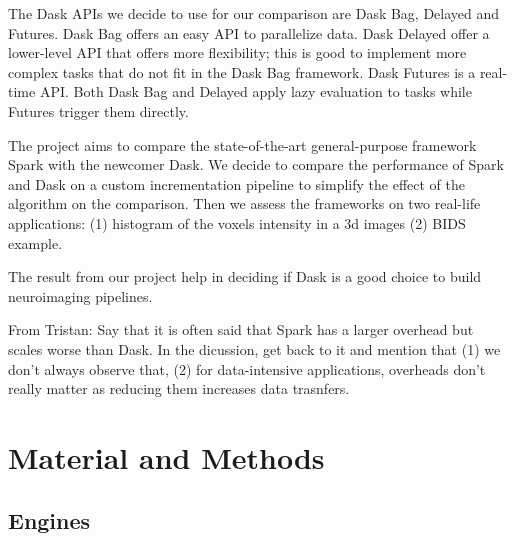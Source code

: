 \documentclass[conference]{IEEEtran}
\newcommand{\TG}[1]{\color{cyan}From Tristan: #1 \color{black}}
\begin{document}
The Dask APIs we decide to use for our comparison are Dask Bag, Delayed and Futures.
Dask Bag offers an easy API to parallelize data. Dask Delayed offer a lower-level API
that offers more flexibility; this is good to implement more complex tasks that do
not fit in the Dask Bag framework. Dask Futures is a real-time API. Both Dask Bag and
Delayed apply lazy evaluation to tasks while Futures trigger them directly.

The project aims to compare the state-of-the-art general-purpose framework Spark with
the newcomer Dask. We decide to compare the performance of Spark and Dask on a custom
incrementation pipeline to simplify the effect of the algorithm on the comparison.
Then we assess the frameworks on two real-life applications: (1) histogram of the
voxels intensity in a 3d images (2) BIDS example.

The result from our project help in deciding if Dask is a good choice to build
neuroimaging pipelines.

\TG{Say that it is often said that Spark has a larger overhead but scales 
worse than Dask. In the dicussion, get back to it and mention that (1) we don't
always observe that, (2) for data-intensive applications, overheads don't really matter
as reducing them increases data trasnfers.}

\section{Material and Methods}

\subsection{Engines}
\end{document}
